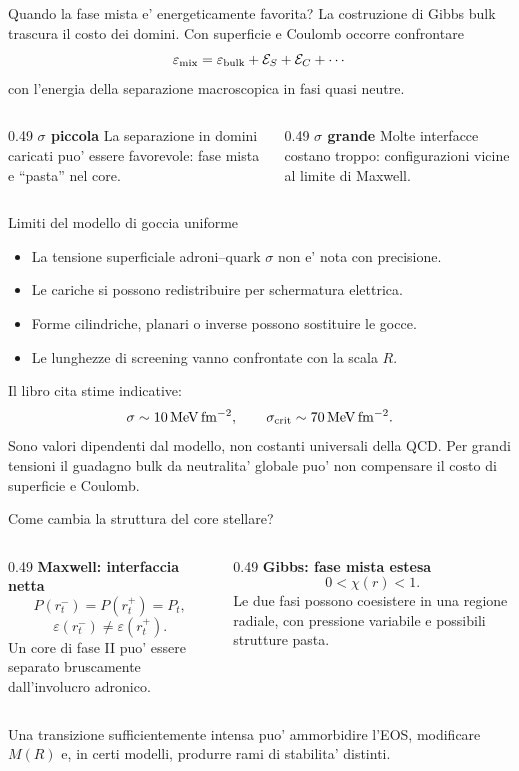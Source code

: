 \begin{frame}{Quando la fase mista e' energeticamente favorita?}
\small
La costruzione di Gibbs bulk trascura il costo dei domini.
Con superficie e Coulomb occorre confrontare
\[
\varepsilon_{\rm mix}
=\varepsilon_{\rm bulk}+\mathcal E_S+\mathcal E_C+\cdots
\]
con l'energia della separazione macroscopica in fasi quasi neutre.
\begin{columns}[T,onlytextwidth]
\begin{column}{0.49\textwidth}
\textbf{$\sigma$ piccola}
\medskip
La separazione in domini caricati puo' essere favorevole:
fase mista e ``pasta'' nel core.
\end{column}
\begin{column}{0.49\textwidth}
\textbf{$\sigma$ grande}
\medskip
Molte interfacce costano troppo:
configurazioni vicine al limite di Maxwell.
\end{column}
\end{columns}
\end{frame}

\begin{frame}{Limiti del modello di goccia uniforme}
\small
\begin{itemize}
\item La tensione superficiale adroni--quark $\sigma$ non e' nota con precisione.
\item Le cariche si possono redistribuire per schermatura elettrica.
\item Forme cilindriche, planari o inverse possono sostituire le gocce.
\item Le lunghezze di screening vanno confrontate con la scala $R$.
\end{itemize}
\medskip
Il libro cita stime indicative:
\[
\sigma\sim10\,\mathrm{MeV\,fm^{-2}},
\qquad
\sigma_{\rm crit}\sim70\,\mathrm{MeV\,fm^{-2}}.
\]
\footnotesize
Sono valori dipendenti dal modello, non costanti universali della QCD.
Per grandi tensioni il guadagno bulk da neutralita' globale
puo' non compensare il costo di superficie e Coulomb.
\end{frame}

\begin{frame}{Come cambia la struttura del core stellare?}
\small
\begin{columns}[T,onlytextwidth]
\begin{column}{0.49\textwidth}
\textbf{Maxwell: interfaccia netta}
\[
P(r_t^-)=P(r_t^+)=P_t,
\]
\[
\varepsilon(r_t^-)\ne\varepsilon(r_t^+).
\]
Un core di fase II puo' essere separato
bruscamente dall'involucro adronico.
\end{column}
\begin{column}{0.49\textwidth}
\textbf{Gibbs: fase mista estesa}
\[
0<\chi(r)<1.
\]
Le due fasi possono coesistere
in una regione radiale, con pressione
variabile e possibili strutture pasta.
\end{column}
\end{columns}
\medskip
Una transizione sufficientemente intensa puo' ammorbidire l'EOS,
modificare $M(R)$ e, in certi modelli, produrre rami di stabilita' distinti.
\end{frame}


